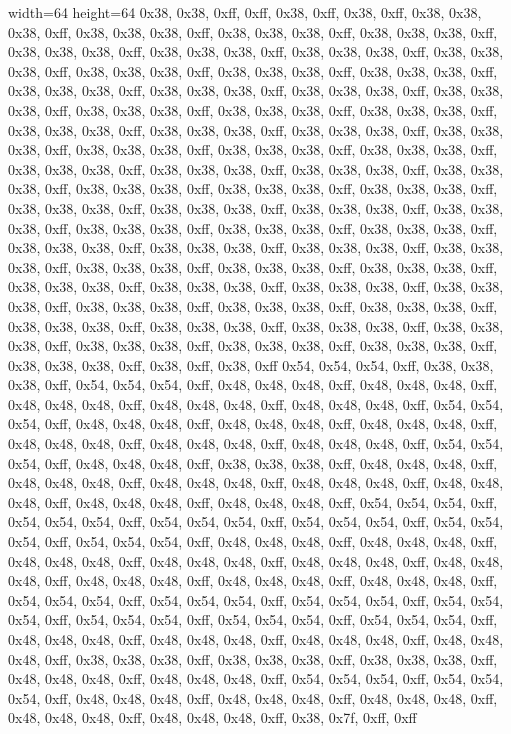 width=64
height=64
0x38, 0x38, 0xff, 0xff, 0x38, 0xff, 0x38, 0xff, 0x38, 0x38, 0x38, 0xff, 0x38, 0x38, 0x38, 0xff, 0x38, 0x38, 0x38, 0xff, 0x38, 0x38, 0x38, 0xff, 0x38, 0x38, 0x38, 0xff, 0x38, 0x38, 0x38, 0xff, 0x38, 0x38, 0x38, 0xff, 0x38, 0x38, 0x38, 0xff, 0x38, 0x38, 0x38, 0xff, 0x38, 0x38, 0x38, 0xff, 0x38, 0x38, 0x38, 0xff, 0x38, 0x38, 0x38, 0xff, 0x38, 0x38, 0x38, 0xff, 0x38, 0x38, 0x38, 0xff, 0x38, 0x38, 0x38, 0xff, 0x38, 0x38, 0x38, 0xff, 0x38, 0x38, 0x38, 0xff, 0x38, 0x38, 0x38, 0xff, 0x38, 0x38, 0x38, 0xff, 0x38, 0x38, 0x38, 0xff, 0x38, 0x38, 0x38, 0xff, 0x38, 0x38, 0x38, 0xff, 0x38, 0x38, 0x38, 0xff, 0x38, 0x38, 0x38, 0xff, 0x38, 0x38, 0x38, 0xff, 0x38, 0x38, 0x38, 0xff, 0x38, 0x38, 0x38, 0xff, 0x38, 0x38, 0x38, 0xff, 0x38, 0x38, 0x38, 0xff, 0x38, 0x38, 0x38, 0xff, 0x38, 0x38, 0x38, 0xff, 0x38, 0x38, 0x38, 0xff, 0x38, 0x38, 0x38, 0xff, 0x38, 0x38, 0x38, 0xff, 0x38, 0x38, 0x38, 0xff, 0x38, 0x38, 0x38, 0xff, 0x38, 0x38, 0x38, 0xff, 0x38, 0x38, 0x38, 0xff, 0x38, 0x38, 0x38, 0xff, 0x38, 0x38, 0x38, 0xff, 0x38, 0x38, 0x38, 0xff, 0x38, 0x38, 0x38, 0xff, 0x38, 0x38, 0x38, 0xff, 0x38, 0x38, 0x38, 0xff, 0x38, 0x38, 0x38, 0xff, 0x38, 0x38, 0x38, 0xff, 0x38, 0x38, 0x38, 0xff, 0x38, 0x38, 0x38, 0xff, 0x38, 0x38, 0x38, 0xff, 0x38, 0x38, 0x38, 0xff, 0x38, 0x38, 0x38, 0xff, 0x38, 0x38, 0x38, 0xff, 0x38, 0x38, 0x38, 0xff, 0x38, 0x38, 0x38, 0xff, 0x38, 0x38, 0x38, 0xff, 0x38, 0x38, 0x38, 0xff, 0x38, 0x38, 0x38, 0xff, 0x38, 0x38, 0x38, 0xff, 0x38, 0x38, 0x38, 0xff, 0x38, 0x38, 0x38, 0xff, 0x38, 0x38, 0x38, 0xff, 0x38, 0xff, 0x38, 0xff
0x54, 0x54, 0x54, 0xff, 0x38, 0x38, 0x38, 0xff, 0x54, 0x54, 0x54, 0xff, 0x48, 0x48, 0x48, 0xff, 0x48, 0x48, 0x48, 0xff, 0x48, 0x48, 0x48, 0xff, 0x48, 0x48, 0x48, 0xff, 0x48, 0x48, 0x48, 0xff, 0x54, 0x54, 0x54, 0xff, 0x48, 0x48, 0x48, 0xff, 0x48, 0x48, 0x48, 0xff, 0x48, 0x48, 0x48, 0xff, 0x48, 0x48, 0x48, 0xff, 0x48, 0x48, 0x48, 0xff, 0x48, 0x48, 0x48, 0xff, 0x54, 0x54, 0x54, 0xff, 0x48, 0x48, 0x48, 0xff, 0x38, 0x38, 0x38, 0xff, 0x48, 0x48, 0x48, 0xff, 0x48, 0x48, 0x48, 0xff, 0x48, 0x48, 0x48, 0xff, 0x48, 0x48, 0x48, 0xff, 0x48, 0x48, 0x48, 0xff, 0x48, 0x48, 0x48, 0xff, 0x48, 0x48, 0x48, 0xff, 0x54, 0x54, 0x54, 0xff, 0x54, 0x54, 0x54, 0xff, 0x54, 0x54, 0x54, 0xff, 0x54, 0x54, 0x54, 0xff, 0x54, 0x54, 0x54, 0xff, 0x54, 0x54, 0x54, 0xff, 0x48, 0x48, 0x48, 0xff, 0x48, 0x48, 0x48, 0xff, 0x48, 0x48, 0x48, 0xff, 0x48, 0x48, 0x48, 0xff, 0x48, 0x48, 0x48, 0xff, 0x48, 0x48, 0x48, 0xff, 0x48, 0x48, 0x48, 0xff, 0x48, 0x48, 0x48, 0xff, 0x48, 0x48, 0x48, 0xff, 0x54, 0x54, 0x54, 0xff, 0x54, 0x54, 0x54, 0xff, 0x54, 0x54, 0x54, 0xff, 0x54, 0x54, 0x54, 0xff, 0x54, 0x54, 0x54, 0xff, 0x54, 0x54, 0x54, 0xff, 0x54, 0x54, 0x54, 0xff, 0x48, 0x48, 0x48, 0xff, 0x48, 0x48, 0x48, 0xff, 0x48, 0x48, 0x48, 0xff, 0x48, 0x48, 0x48, 0xff, 0x38, 0x38, 0x38, 0xff, 0x38, 0x38, 0x38, 0xff, 0x38, 0x38, 0x38, 0xff, 0x48, 0x48, 0x48, 0xff, 0x48, 0x48, 0x48, 0xff, 0x54, 0x54, 0x54, 0xff, 0x54, 0x54, 0x54, 0xff, 0x48, 0x48, 0x48, 0xff, 0x48, 0x48, 0x48, 0xff, 0x48, 0x48, 0x48, 0xff, 0x48, 0x48, 0x48, 0xff, 0x48, 0x48, 0x48, 0xff, 0x38, 0x7f, 0xff, 0xff
